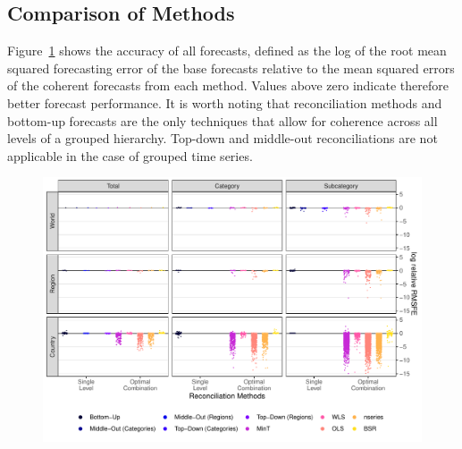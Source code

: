 \documentclass[a4paper,fleqn,11pt]{article}
\begin{document}
\subsection{Comparison of Methods}

Figure~\ref{fig:rmse_all} shows the accuracy of all forecasts, defined as the log of the root mean squared forecasting error of the base forecasts relative to the mean squared errors of the coherent forecasts from each method. Values above zero indicate therefore better forecast performance. It is worth noting that reconciliation methods and bottom-up forecasts are the only techniques that allow for coherence across all levels of a grouped hierarchy. Top-down and middle-out reconciliations are not applicable in the case of grouped time series.

\begin{figure}[H]
	\includegraphics[width=\textwidth]{fig/fig_rmsfe_dots}
	\label{fig:rmse_all}
\end{figure}
\end{document}
